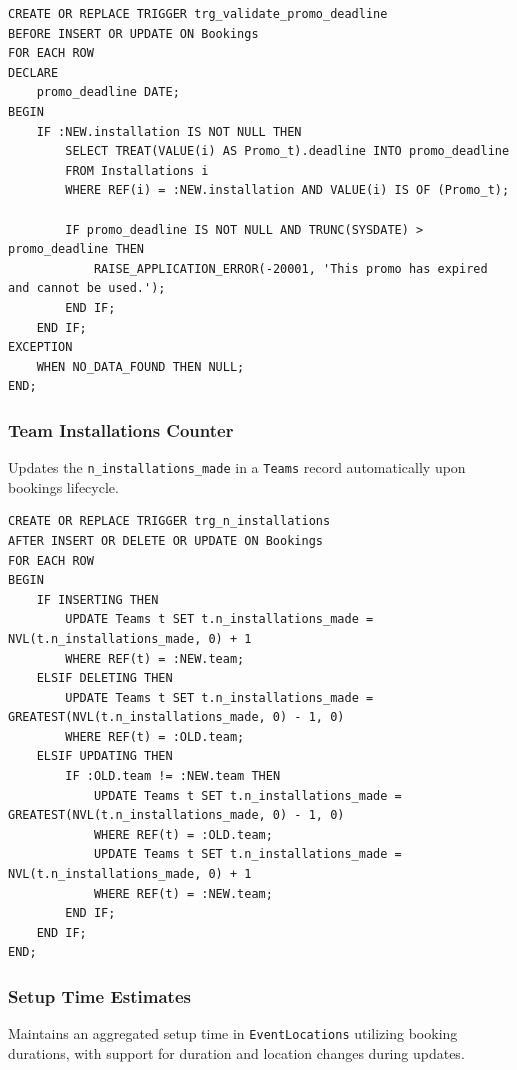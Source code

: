\begin{verbatim}
CREATE OR REPLACE TRIGGER trg_validate_promo_deadline
BEFORE INSERT OR UPDATE ON Bookings
FOR EACH ROW
DECLARE
    promo_deadline DATE;
BEGIN
    IF :NEW.installation IS NOT NULL THEN
        SELECT TREAT(VALUE(i) AS Promo_t).deadline INTO promo_deadline
        FROM Installations i
        WHERE REF(i) = :NEW.installation AND VALUE(i) IS OF (Promo_t);
        
        IF promo_deadline IS NOT NULL AND TRUNC(SYSDATE) > promo_deadline THEN
            RAISE_APPLICATION_ERROR(-20001, 'This promo has expired and cannot be used.');
        END IF;
    END IF;
EXCEPTION
    WHEN NO_DATA_FOUND THEN NULL; 
END;
\end{verbatim}

\subsubsection{Team Installations Counter}
Updates the \texttt{n\_installations\_made} in a \texttt{Teams} record automatically upon bookings lifecycle.

\begin{verbatim}
CREATE OR REPLACE TRIGGER trg_n_installations
AFTER INSERT OR DELETE OR UPDATE ON Bookings
FOR EACH ROW
BEGIN
    IF INSERTING THEN
        UPDATE Teams t SET t.n_installations_made = NVL(t.n_installations_made, 0) + 1 
        WHERE REF(t) = :NEW.team;
    ELSIF DELETING THEN
        UPDATE Teams t SET t.n_installations_made = GREATEST(NVL(t.n_installations_made, 0) - 1, 0) 
        WHERE REF(t) = :OLD.team;
    ELSIF UPDATING THEN
        IF :OLD.team != :NEW.team THEN
            UPDATE Teams t SET t.n_installations_made = GREATEST(NVL(t.n_installations_made, 0) - 1, 0) 
            WHERE REF(t) = :OLD.team;
            UPDATE Teams t SET t.n_installations_made = NVL(t.n_installations_made, 0) + 1 
            WHERE REF(t) = :NEW.team;
        END IF;
    END IF;
END;
\end{verbatim}

\subsubsection{Setup Time Estimates}
Maintains an aggregated setup time in \texttt{EventLocations} utilizing booking durations, with support for duration and location changes during updates.

